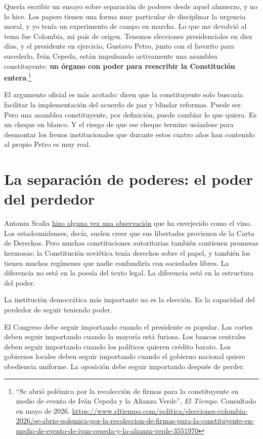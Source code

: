 \documentclass[11pt,letterpaper]{article}
\begin{document}
Quería escribir un ensayo sobre separación de poderes desde aquel almuerzo, y no lo hice. Los papers tienen una forma muy particular de disciplinar la urgencia moral, y yo tenía un experimento de campo en marcha. Lo que me devolvió al tema fue Colombia, mi país de origen. Tenemos elecciones presidenciales en diez días, y el presidente en ejercicio, Gustavo Petro, junto con el favorito para sucederlo, Iván Cepeda, están impulsando activamente una asamblea constituyente: \textbf{un órgano con poder para reescribir la Constitución entera}.\footnote{``Se abrió polémica por la recolección de firmas para la constituyente en medio de evento de Iván Cepeda y la Alianza Verde'', \textit{El Tiempo}. Consultado en mayo de 2026. \url{https://www.eltiempo.com/politica/elecciones-colombia-2026/se-abrio-polemica-por-la-recoleccion-de-firmas-para-la-constituyente-en-medio-de-evento-de-ivan-cepeda-y-la-alianza-verde-3551970}}

El argumento oficial es más acotado: dicen que la constituyente solo buscaría facilitar la implementación del acuerdo de paz y blindar reformas. Puede ser. Pero una asamblea constituyente, por definición, puede cambiar lo que quiera. Es un cheque en blanco. Y el riesgo de que ese cheque termine usándose para desmontar los frenos institucionales que durante estos cuatro años han contenido al propio Petro es muy real.

\section{La separación de poderes: el poder del perdedor}

Antonin Scalia \href{https://x.com/i/status/2025152903921475665}{hizo alguna vez una observación} que ha envejecido como el vino. Los estadounidenses, decía, suelen creer que sus libertades provienen de la Carta de Derechos. Pero muchas constituciones autoritarias también contienen promesas hermosas: la Constitución soviética tenía derechos sobre el papel, y también los tienen muchos regímenes que nadie confundiría con sociedades libres. La diferencia no está en la poesía del texto legal. La diferencia está en la estructura del poder.

La institución democrática más importante no es la elección. Es la capacidad del perdedor de seguir teniendo poder.

El Congreso debe seguir importando cuando el presidente es popular. Las cortes deben seguir importando cuando la mayoría está furiosa. Los bancos centrales deben seguir importando cuando los políticos quieren crédito barato. Los gobiernos locales deben seguir importando cuando el gobierno nacional quiere obediencia uniforme. La oposición debe seguir importando después de perder.
\end{document}
